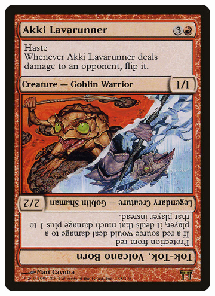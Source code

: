 \begin{figure}[ht]
\begin{subfigure}{0.25\textwidth}
		\includegraphics[width=1.0\textwidth]{Immagini/akki.jpg}
	\end{subfigure}%
 	\begin{subfigure}{0.25\textwidth}

\end{subfigure}
\end{figure}

